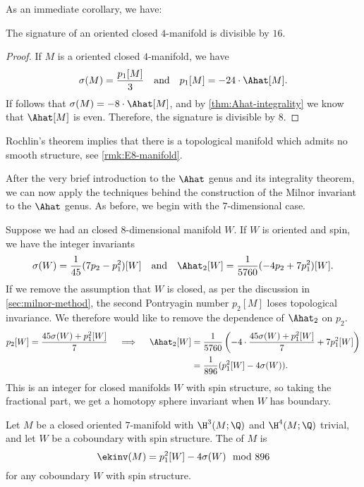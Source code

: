 As an immediate corollary, we have:

\begin{theorem}[Rochlin]\label{thm:rochlin}
	The signature of an oriented closed $4$-manifold is divisible by $16$.
\end{theorem}
\begin{proof}
	If $M$ is a oriented closed $4$-manifold, we have
	\[
		\sigma(M) = \frac{p_1[M]}{3}\quad\textrm{and}\quad p_1[M] = -24\cdot\Ahat[M].
	\]
	If follows that $\sigma(M)=-8\cdot\Ahat[M]$, and by \cref{thm:Ahat-integrality} we know that $\Ahat[M]$ is even. Therefore, the signature is divisible by $8$.
\end{proof}

\begin{remark}
	Rochlin's theorem implies that there is a topological manifold which admits no smooth structure, see \cref{rmk:E8-manifold}.
\end{remark}

After the very brief introduction to the $\Ahat$ genus and its integrality theorem, we can now apply the techniques behind the construction of the Milnor invariant to the $\Ahat$ genus. As before, we begin with the $7$-dimensional case. 

Suppose we had an closed $8$-dimensional manifold $W$. If $W$ is oriented and spin, we have the integer invariants
\[
	\sigma(W) = \frac{1}{45}(7p_2- p_1^2)[W]\quad\textrm{and}\quad\Ahat_2[W] = \frac{1}{5760}(-4p_2 + 7p_1^2)[W].
\]
If we remove the assumption that $W$ is closed, as per the discussion in \cref{sec:milnor-method}, the second Pontryagin number $p_2[M]$ loses topological invariance. We therefore would like to remove the dependence of $\Ahat_2$ on $p_2$. 
\[
\begin{aligned}
	p_2[W] = \frac{45\sigma(W) +p_1^2[W]}{7}\quad\implies\quad 
	\Ahat_2[W] &= \frac{1}{5760}\left(-4\cdot \frac{45\sigma(W) + p_1^2[W]}{7} + 7p_1^2[W]\right)\\
						 &=\frac{1}{896}(p_1^2[W]-4\sigma(W)).
\end{aligned}
\]
This is an integer for closed manifolds $W$ with spin structure, so taking the fractional part, we get a homotopy sphere invariant when $W$ has boundary.

\begin{definition}\label{def:eells-kupier-7-dimension}
	Let $M$ be a closed oriented $7$-manifold with $\H^3(M;\Q)$ and $\H^4(M;\Q)$ trivial, and let $W$ be a coboundary with spin structure. The  of $M$ is
	\[
		\ekinv(M) = p_1^2[W]-4\sigma(W)\mod 896
	\]
	for any coboundary $W$ with spin structure.
\end{definition}

